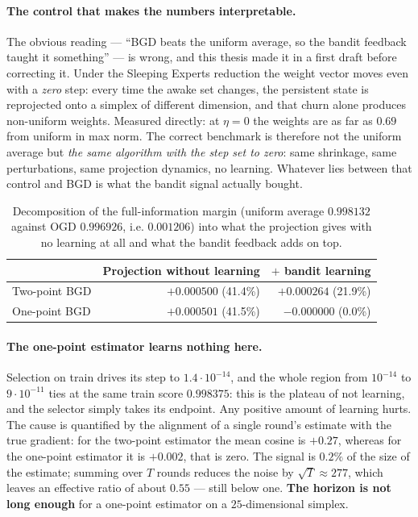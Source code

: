 \documentclass[12pt,a4paper,oneside]{report}
\renewcommand{\_}{\oldunderscore\allowbreak}
\theoremstyle{definition}
\theoremstyle{plain}
\theoremstyle{remark}
\begin{document}
\paragraph{The control that makes the numbers interpretable.} The obvious reading --- ``BGD beats
the uniform average, so the bandit feedback taught it something'' --- is wrong, and this thesis
made it in a first draft before correcting it. Under the Sleeping Experts reduction the weight
vector moves even with a \emph{zero} step: every time the awake set changes, the persistent state
is reprojected onto a simplex of different dimension, and that churn alone produces non-uniform
weights. Measured directly: at $\eta=0$ the weights are as far as $0.69$ from uniform in max
norm. The correct benchmark is therefore not the uniform average but \emph{the same algorithm
with the step set to zero}: same shrinkage, same perturbations, same projection dynamics, no
learning. Whatever lies between that control and BGD is what the bandit signal actually bought.

\begin{table}[H]
\centering
\small
\begin{tabular}{lrr}
\toprule
& \textbf{Projection without learning} & \textbf{$+$ bandit learning} \\
\midrule
Two-point BGD & $+0.000500$ \;(41.4\%) & $+0.000264$ \;(21.9\%) \\
One-point BGD & $+0.000501$ \;(41.5\%) & $\mathbf{-0.000000}$ \;(0.0\%) \\
\bottomrule
\end{tabular}
\caption{Decomposition of the full-information margin (uniform average $0.998132$ against OGD
$0.996926$, i.e. $0.001206$) into what the projection gives with no learning at all and what the
bandit feedback adds on top.}
\label{tab:bandit-decomp}
\end{table}

\paragraph{The one-point estimator learns nothing here.} Selection on train drives its step to
$1.4\cdot10^{-14}$, and the whole region from $10^{-14}$ to $9\cdot10^{-11}$ ties at the same
train score $0.998375$: this is the plateau of not learning, and the selector simply takes its
endpoint. Any positive amount of learning hurts. The cause is quantified by the alignment of a
single round's estimate with the true gradient: for the two-point estimator the mean cosine is
$+0.27$, whereas for the one-point estimator it is $+0.002$, that is zero. The signal is $0.2\%$
of the size of the estimate; summing over $T$ rounds reduces the noise by $\sqrt{T}\approx277$,
which leaves an effective ratio of about $0.55$ --- still below one. \textbf{The horizon is not
long enough} for a one-point estimator on a $25$-dimensional simplex.
\end{document}
